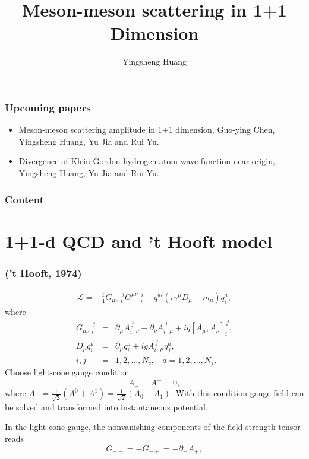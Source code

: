 \documentclass[8pt]{beamer}
\title{Meson-meson scattering in 1+1 Dimension%
}
\author{Yingsheng Huang}
\institute{Institute of High Energy Physics
}
\begin{document}
\maketitle

\begin{frame}
	\frametitle{Upcoming papers}
	\begin{itemize}
		\item Meson-meson scattering amplitude in 1+1 dimension, Guo-ying Chen, Yingsheng Huang, Yu Jia and Rui Yu.
		\item Divergence of Klein-Gordon hydrogen atom wave-function near origin, Yingsheng Huang, Yu Jia and Rui Yu.
	\end{itemize}
\end{frame}

\begin{frame}
	\frametitle{Content}
	\tableofcontents


\end{frame}

\section{1+1-d QCD and 't Hooft model }
\begin{frame}
	\frametitle{\insertsectionhead ('t Hooft, 1974)}
	\begin{eqnarray}
		\mathcal{L}=-\frac{1}{4}G_{\mu\nu}\ _{i}^{\ j}G^{\mu\nu}\ _{j}^{\
		i}+\bar q^{a i}(i\gamma^\mu D_\mu-m_a)q_i^a,
	\end{eqnarray}
	where
	\begin{eqnarray}
		G_{\mu\nu}\ _{i}^{\ j}&=&\partial_{\mu} A_{i}^{\ j}\
		_{\nu}-\partial_\nu A_{i}^{\ j}\ _{\mu}+i g[A_\mu,A_\nu]_{i}^{\
				j},\nonumber\\
		D_\mu q_i^a&=&\partial_\mu q_i^a+ig A_i^{\ j}\ _\mu q_j^a,\nonumber\\
		i,j&=&1,2,...,N_c, \ \ \ \ a=1,2,...,N_f.
	\end{eqnarray}
	Choose light-cone gauge condition
	\begin{equation}
		A_{-}=A^{+}=0,
	\end{equation}
	where
	$A_{-}=\frac{1}{\sqrt{2}}(A^0+A^1)=\frac{1}{\sqrt{2}}(A_0-A_1)$. With this condition gauge field can be solved and transformed into instantaneous potential.

	In
	the light-cone gauge, the nonvanishing components of the field
	strength tensor reads
	\begin{equation}
		G_{+-}=-G_{-+}=-\partial_{-}A_{+},
	\end{equation}


\end{frame}
\end{document}

